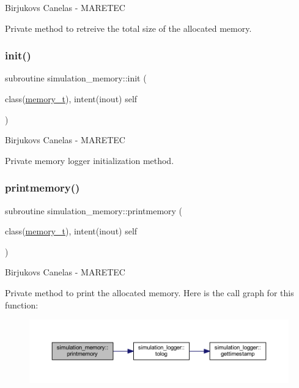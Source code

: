 Birjukovs Canelas -\/ M\+A\+R\+E\+T\+EC 

Private method to retreive the total size of the allocated memory. \mbox{\label{namespacesimulation__memory_a638f6d140103702b9e9cc46e2c060c61}} 
\subsubsection{\texorpdfstring{init()}{init()}}
{\footnotesize\ttfamily subroutine simulation\+\_\+memory\+::init (\begin{DoxyParamCaption}\item[{class(\mbox{\hyperlink{structsimulation__memory_1_1memory__t}{memory\+\_\+t}}), intent(inout)}]{self }\end{DoxyParamCaption})\hspace{0.3cm}{\ttfamily [private]}}



Birjukovs Canelas -\/ M\+A\+R\+E\+T\+EC 

Private memory logger initialization method. \mbox{\label{namespacesimulation__memory_a5827bef8479b809a453af147ceaa8c7c}} 
\subsubsection{\texorpdfstring{printmemory()}{printmemory()}}
{\footnotesize\ttfamily subroutine simulation\+\_\+memory\+::printmemory (\begin{DoxyParamCaption}\item[{class(\mbox{\hyperlink{structsimulation__memory_1_1memory__t}{memory\+\_\+t}}), intent(inout)}]{self }\end{DoxyParamCaption})\hspace{0.3cm}{\ttfamily [private]}}



Birjukovs Canelas -\/ M\+A\+R\+E\+T\+EC 

Private method to print the allocated memory. Here is the call graph for this function\+:
\nopagebreak
\begin{figure}[H]
\begin{center}
\leavevmode
\includegraphics[width=350pt]{namespacesimulation__memory_a5827bef8479b809a453af147ceaa8c7c_cgraph}
\end{center}
\end{figure}


